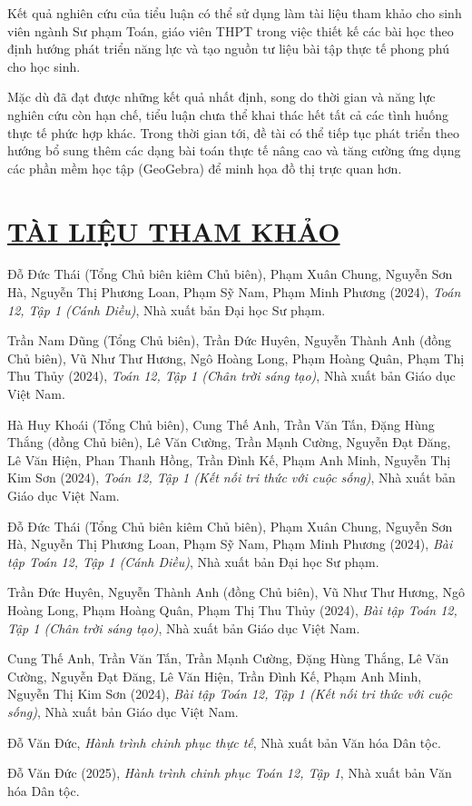 \documentclass[12pt,a4paper,oneside]{book}
\theoremstyle{theorem}
\theoremstyle{definition}
\begin{document}
    Kết quả nghiên cứu của tiểu luận có thể sử dụng làm tài liệu tham khảo cho sinh viên ngành Sư phạm Toán, giáo viên THPT trong việc thiết kế các bài học theo định hướng phát triển năng lực và tạo nguồn tư liệu bài tập thực tế phong phú cho học sinh.  
    
    Mặc dù đã đạt được những kết quả nhất định, song do thời gian và năng lực nghiên cứu còn hạn chế, tiểu luận chưa thể khai thác hết tất cả các tình huống thực tế phức hợp khác. Trong thời gian tới, đề tài có thể tiếp tục phát triển theo hướng bổ sung thêm các dạng bài toán thực tế nâng cao và tăng cường ứng dụng các phần mềm học tập (GeoGebra) để minh họa đồ thị trực quan hơn.

  

    \chapter*{\underline{TÀI LIỆU THAM KHẢO}}
    \noindent [1] Đỗ Đức Thái (Tổng Chủ biên kiêm Chủ biên), Phạm Xuân Chung, Nguyễn Sơn Hà, Nguyễn Thị Phương Loan, Phạm Sỹ Nam, Phạm Minh Phương (2024), \textit{Toán 12, Tập 1 (Cánh Diều)}, Nhà xuất bản Đại học Sư phạm.

    \noindent [2] Trần Nam Dũng (Tổng Chủ biên), Trần Đức Huyên, Nguyễn Thành Anh (đồng Chủ biên), Vũ Như Thư Hương, Ngô Hoàng Long, Phạm Hoàng Quân, Phạm Thị Thu Thủy (2024), \textit{Toán 12, Tập 1 (Chân trời sáng tạo)}, Nhà xuất bản Giáo dục Việt Nam.
    
    \noindent [3] Hà Huy Khoái (Tổng Chủ biên), Cung Thế Anh, Trần Văn Tấn, Đặng Hùng Thắng (đồng Chủ biên), Lê Văn Cường, Trần Mạnh Cường, Nguyễn Đạt Đăng, Lê Văn Hiện, Phan Thanh Hồng, Trần Đình Kế, Phạm Anh Minh, Nguyễn Thị Kim Sơn (2024), \textit{Toán 12, Tập 1 (Kết nối tri thức với cuộc sống)}, Nhà xuất bản Giáo dục Việt Nam.
    
    \noindent [4] Đỗ Đức Thái (Tổng Chủ biên kiêm Chủ biên), Phạm Xuân Chung, Nguyễn Sơn Hà, Nguyễn Thị Phương Loan, Phạm Sỹ Nam, Phạm Minh Phương (2024), \textit{Bài tập Toán 12, Tập 1 (Cánh Diều)}, Nhà xuất bản Đại học Sư phạm.
    
    \noindent [5] Trần Đức Huyên, Nguyễn Thành Anh (đồng Chủ biên), Vũ Như Thư Hương, Ngô Hoàng Long, Phạm Hoàng Quân, Phạm Thị Thu Thủy (2024), \textit{Bài tập Toán 12, Tập 1 (Chân trời sáng tạo)}, Nhà xuất bản Giáo dục Việt Nam.
    
    \noindent [6] Cung Thế Anh, Trần Văn Tấn, Trần Mạnh Cường, Đặng Hùng Thắng, Lê Văn Cường, Nguyễn Đạt Đăng, Lê Văn Hiện, Trần Đình Kế, Phạm Anh Minh, Nguyễn Thị Kim Sơn (2024), \textit{Bài tập Toán 12, Tập 1 (Kết nối tri thức với cuộc sống)}, Nhà xuất bản Giáo dục Việt Nam.
    
    \noindent [7] Đỗ Văn Đức, \textit{Hành trình chinh phục thực tế}, Nhà xuất bản Văn hóa Dân tộc.

    \noindent [8] Đỗ Văn Đức (2025), \textit{Hành trình chinh phục Toán 12, Tập 1}, Nhà xuất bản Văn hóa Dân tộc.




        
\end{document}

